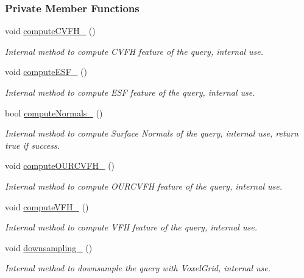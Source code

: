 \subsubsection*{Private Member Functions}
\begin{DoxyCompactItemize}
\item 
void \hyperlink{classPoseEstimation_aec68d8103e751c230fc8a6d8ea07c09f}{compute\-C\-V\-F\-H\-\_\-} ()
\begin{DoxyCompactList}\small\item\em Internal method to compute C\-V\-F\-H feature of the query, internal use. \end{DoxyCompactList}\item 
void \hyperlink{classPoseEstimation_a5609c5fbccc84d66bc9a8aa5da68aacc}{compute\-E\-S\-F\-\_\-} ()
\begin{DoxyCompactList}\small\item\em Internal method to compute E\-S\-F feature of the query, internal use. \end{DoxyCompactList}\item 
bool \hyperlink{classPoseEstimation_aa1a41fbd7d064d12cf220fb6007d4254}{compute\-Normals\-\_\-} ()
\begin{DoxyCompactList}\small\item\em Internal method to compute Surface Normals of the query, internal use, return true if success. \end{DoxyCompactList}\item 
void \hyperlink{classPoseEstimation_aac99373a768dd39a4c3d93485d955f04}{compute\-O\-U\-R\-C\-V\-F\-H\-\_\-} ()
\begin{DoxyCompactList}\small\item\em Internal method to compute O\-U\-R\-C\-V\-F\-H feature of the query, internal use. \end{DoxyCompactList}\item 
void \hyperlink{classPoseEstimation_a8fc876c0ec4398c415b202897d050221}{compute\-V\-F\-H\-\_\-} ()
\begin{DoxyCompactList}\small\item\em Internal method to compute V\-F\-H feature of the query, internal use. \end{DoxyCompactList}\item 
void \hyperlink{classPoseEstimation_a62b07e83b4f4e4dc531cb53b53d6722e}{downsampling\-\_\-} ()
\begin{DoxyCompactList}\small\item\em Internal method to downsample the query with Voxel\-Grid, internal use. \end{DoxyCompactList}\item 

\end{DoxyCompactItemize}
